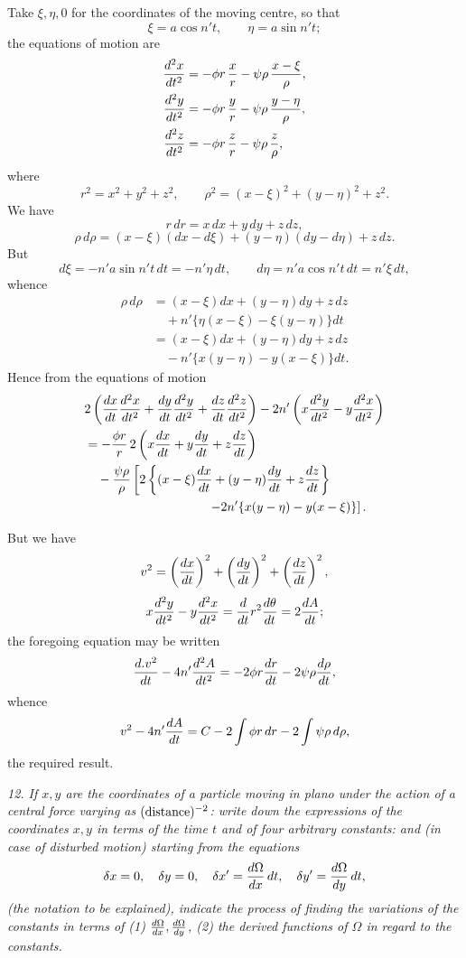 \documentclass[11pt,a4paper]{article}
\theoremstyle{plain}
\theoremstyle{definition}
\begin{document}
Take $\xi,\eta,0$ for the coordinates of the moving centre, so that
\[
\xi=a\cos n't,\qquad \eta=a\sin n't;
\]
the equations of motion are
\[
\begin{aligned}
{d^2x\over dt^2}&=-\phi r\,{x\over r}-\psi\rho\,{x-\xi\over\rho},\\
{d^2y\over dt^2}&=-\phi r\,{y\over r}-\psi\rho\,{y-\eta\over\rho},\\
{d^2z\over dt^2}&=-\phi r\,{z\over r}-\psi\rho\,{z\over\rho},
\end{aligned}
\]
where
\[
r^2=x^2+y^2+z^2,\qquad
\rho^2=(x-\xi)^2+(y-\eta)^2+z^2.
\]
We have
\[
r\,dr=x\,dx+y\,dy+z\,dz,
\]
\[
\rho\,d\rho=(x-\xi)(dx-d\xi)+(y-\eta)(dy-d\eta)+z\,dz.
\]
But
\[
d\xi=-n'a\sin n't\,dt=-n'\eta\,dt,\qquad
d\eta=n'a\cos n't\,dt=n'\xi\,dt,
\]
whence
\[
\begin{aligned}
\rho\,d\rho
&=(x-\xi)dx+(y-\eta)dy+z\,dz\\
&\quad+n'\{\eta(x-\xi)-\xi(y-\eta)\}dt\\
&=(x-\xi)dx+(y-\eta)dy+z\,dz\\
&\quad-n'\{x(y-\eta)-y(x-\xi)\}dt.
\end{aligned}
\]
Hence from the equations of motion
\[
\begin{aligned}
&2\left({dx\over dt}{d^2x\over dt^2}+{dy\over dt}{d^2y\over dt^2}
+{dz\over dt}{d^2z\over dt^2}\right)
-2n'\left(x{d^2y\over dt^2}-y{d^2x\over dt^2}\right)\\
&=-{\phi r\over r}\,2\left(x{dx\over dt}+y{dy\over dt}+z{dz\over dt}\right)\\
&\quad-{\psi\rho\over\rho}\left[2\left\{(x-\xi){dx\over dt}+(y-\eta){dy\over dt}+z{dz\over dt}\right\}\right.\\
&\hspace{1.35in}\left.-2n'\{x(y-\eta)-y(x-\xi)\}\right].
\end{aligned}
\]

\newpage

But we have
\[
v^2=\left({dx\over dt}\right)^2+\left({dy\over dt}\right)^2+\left({dz\over dt}\right)^2,
\]
\[
x{d^2y\over dt^2}-y{d^2x\over dt^2}
={d\over dt}r^2{d\theta\over dt}=2{dA\over dt};
\]
the foregoing equation may be written
\[
{d.v^2\over dt}-4n'{d^2A\over dt^2}
=-2\phi r{dr\over dt}-2\psi\rho{d\rho\over dt},
\]
whence
\[
v^2-4n'{dA\over dt}=C-2\int\phi r\,dr-2\int\psi\rho\,d\rho,
\]
the required result.

\medskip
\noindent\textit{12. If $x,y$ are the coordinates of a particle moving in plano under the action of a central force varying as $(\hbox{distance})^{-2}$: write down the expressions of the coordinates $x,y$ in terms of the time $t$ and of four arbitrary constants: and (in case of disturbed motion) starting from the equations}
\[
\delta x=0,\quad \delta y=0,\quad
\delta x'={d\Omega\over dx}\,dt,\quad
\delta y'={d\Omega\over dy}\,dt,
\]
\textit{(the notation to be explained), indicate the process of finding the variations of the constants in terms of (1) ${d\Omega\over dx},{d\Omega\over dy}$, (2) the derived functions of $\Omega$ in regard to the constants.}
\end{document}
